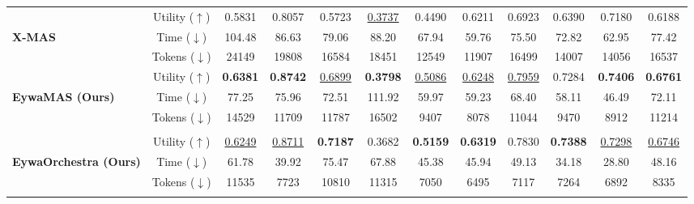 \begin{table}[!t]
{\begin{tabular}{l|c|ccc|ccc|ccc|c}
        \cellcolor{blue!7}
        & Utility ($\uparrow$)   & 0.5831 & 0.8057 & 0.5723 & \underline{0.3737} & 0.4490 & 0.6211 & 0.6923 & 0.6390 & 0.7180 & 0.6188\\
        \cellcolor{blue!7}\textbf{X-MAS \citeyearpar{DBLP:journals/corr/abs-2505-16997}}
        & Time ($\downarrow$)  & 104.48 & 86.63 & 79.06 & 88.20 & 67.94 & 59.76 & 75.50 & 72.82 & 62.95 & 77.42\\
        \cellcolor{blue!7}
        & Tokens ($\downarrow$) & 24149 & 19808 & 16584 & 18451 & 12549 & 11907 & 16499 & 14007 & 14056 & 16537\\
        [-0.4ex]\bottomrule

        \cellcolor{violet!7}
        & Utility ($\uparrow$)   & \textbf{0.6381} & \textbf{0.8742} & \underline{0.6899} & \textbf{0.3798} & \underline{0.5086} & \underline{0.6248} & \underline{0.7959} & 0.7284 & \textbf{0.7406} & \textbf{0.6761}\\
        \cellcolor{violet!7}\textbf{EywaMAS (Ours)}
        & Time ($\downarrow$)  & 77.25 & 75.96 & 72.51 & 111.92 & 59.97 & 59.23 & 68.40 & 58.11 & 46.49 & 72.11\\
        \cellcolor{violet!7}
        & Tokens ($\downarrow$) & 14529 & 11709 & 11787 & 16502 & 9407 & 8078 & 11044 & 9470 & 8912 & 11214\\
        
        \addlinespace[-0.4ex] \midrule \addlinespace[-0.000ex]
        \rowcolor{gray!16}
        \multicolumn{12}{c}{
            \rule{0pt}{1.1em}
            \textbf{\textit{Dynamic Orchestration}}
            \rule[-0.3em]{0pt}{1.1em}
        } \\
        [-0.4ex]\midrule\addlinespace[-0.000ex]

        \cellcolor{pink!7}
            & Utility ($\uparrow$)   & \underline{0.6249} & \underline{0.8711} & \textbf{0.7187} & 0.3682 & \textbf{0.5159} & \textbf{0.6319} & 0.7830 & \textbf{0.7388} & \underline{0.7298} & \underline{0.6746}\\
        \cellcolor{pink!7}\textbf{EywaOrchestra (Ours)}
            & Time ($\downarrow$)  & 61.78 & 39.92 & 75.47 & 67.88 & 45.38 & 45.94 & 49.13 & 34.18 & 28.80 & 48.16\\
        \cellcolor{pink!7}
            & Tokens ($\downarrow$) & 11535 & 7723 & 10810 & 11315 & 7050 & 6495 & 7117 & 7264 & 6892 & 8335\\
        [-0.4ex]\bottomrule\addlinespace[-0.000ex]

    \end{tabular}
    }
\end{table}